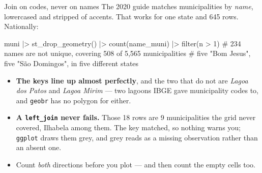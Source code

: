 \documentclass[aspectratio=169,10pt]{beamer}
\newcommand{\code}[1]{\texttt{\small #1}}
\begin{document}
\begin{frame}[fragile]{Join on codes, never on names}
  The 2020 guide matches municipalities by \emph{name}, lowercased and stripped of
  accents. That works for one state and 645 rows. Nationally:
\begin{Rcode}
muni |> st_drop_geometry() |> count(name_muni) |> filter(n > 1)
# 234 names are not unique, covering 508 of 5,565 municipalities
# five "Bom Jesus", five "São Domingos", in five different states
\end{Rcode}
  \vspace{-4pt}
  \begin{itemize}
    \small
    \item \textbf{The keys line up almost perfectly}, and the two that do not are
          \emph{Lagoa dos Patos} and \emph{Lagoa Mirim} --- two lagoons IBGE gave
          municipality codes to, and \code{geobr} has no polygon for either.
    \item \textbf{A \code{left\_join} never fails.} Those 18 rows are 9
          municipalities the grid never covered, Ilhabela among them. The key
          matched, so nothing warns you; \code{ggplot} draws them grey, and grey
          reads as a missing observation rather than an absent one.
    \item Count \emph{both} directions before you plot --- and then count the
          empty cells too.
  \end{itemize}
  \src{\code{climate\_data\_in\_R.R} § 3}
\end{frame}
\end{document}

